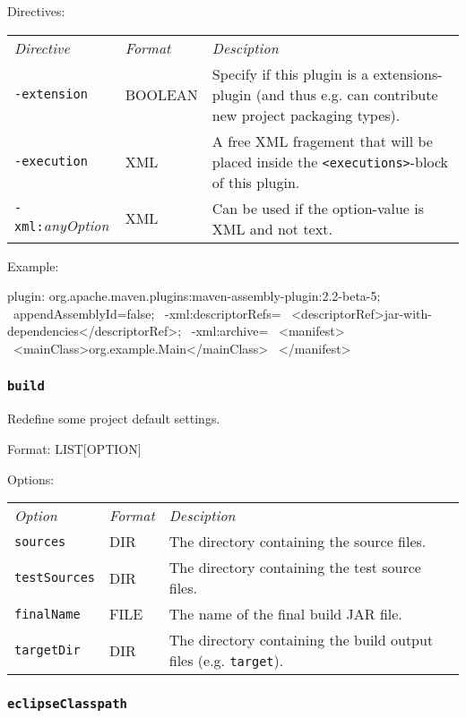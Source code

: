 \documentclass[a4paper,12pt,english,oneside,halfparskip]{scrartcl}
\newcommand{\code}[1]{\texttt{#1}}
\begin{document}
Directives: 

\begin{tabular}{llp{}}
\emph{Directive} & \emph{Format} & \emph{Desciption} \\
\code{-extension} & BOOLEAN & Specify if this plugin is a extensions-plugin (and thus e.g. can contribute new project packaging types). \\
\code{-execution} & XML & A free XML fragement that will be placed inside the \code{<executions>}-block of this plugin. \\
\code{-xml:}\emph{anyOption} & XML & Can be used if the option-value is XML and not text. \\
\end{tabular}

Example:
\begin{Cmdline}
plugin: org.apache.maven.plugins:maven-assembly-plugin:2.2-beta-5; \
 appendAssemblyId=false; \
 -xml:descriptorRefs= \
    <descriptorRef>jar-with-dependencies</descriptorRef>; \
 -xml:archive= \
    <manifest> \
      <mainClass>org.example.Main</mainClass> \
    </manifest>
\end{Cmdline}


\subsubsection{\code{build}}

Redefine some project default settings.

Format: LIST[OPTION]

Options:

\begin{tabular}{llp{}}
\emph{Option} & \emph{Format} & \emph{Desciption} \\
\code{sources} &  DIR & The directory containing the source files. \\
\code{testSources} &  DIR & The directory containing the test source files. \\
\code{finalName} &  FILE & The name of the final build JAR file. \\
\code{targetDir} & DIR & The directory containing the build output files (e.g. \code{target}).
\end{tabular}


\subsubsection{\code{eclipseClasspath}}
\label{secSettingEclipseClasspath}
\end{document}
